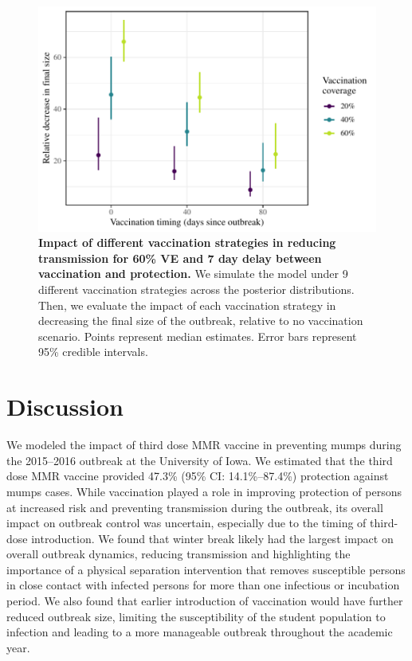 \documentclass[12pt]{article}
\begin{document}
\begin{figure}[!h]
\includegraphics[width=\textwidth]{../figure_stanfit_seirv_final/figure_stanfit_strategy_summ.pdf}
\caption{
\textbf{Impact of different vaccination strategies in reducing transmission for 60\% VE and 7 day delay between vaccination and protection.}
We simulate the model under 9 different vaccination strategies across the posterior distributions.
Then, we evaluate the impact of each vaccination strategy in decreasing the final size of the outbreak, relative to no vaccination scenario.
Points represent median estimates.
Error bars represent 95\% credible intervals.
}
\label{fig:strat}
\end{figure}

\section{Discussion}

We modeled the impact of third dose MMR vaccine in preventing mumps during the 2015--2016 outbreak at the University of Iowa. 
We estimated that the third dose MMR vaccine provided 47.3\% (95\% CI: 14.1\%--87.4\%) protection against mumps cases. 
While vaccination played a role in improving protection of persons at increased risk and preventing transmission during the outbreak, its overall impact on outbreak control was uncertain, especially due to the timing of third-dose introduction. 
We found that winter break likely had the largest impact on overall outbreak dynamics, reducing transmission and highlighting the importance of a physical separation intervention that removes susceptible persons in close contact with infected persons for more than one infectious or incubation period. 
We also found that earlier introduction of vaccination would have further reduced outbreak size, limiting the susceptibility of the student population to infection and leading to a more manageable outbreak throughout the academic year. 
\end{document}
